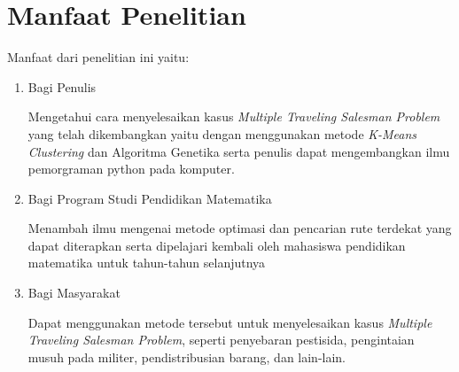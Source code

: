 \section{Manfaat Penelitian}

Manfaat dari penelitian ini yaitu:
\begin{enumerate}
	\item Bagi Penulis

	Mengetahui cara menyelesaikan kasus \textit{Multiple Traveling Salesman Problem} yang telah dikembangkan yaitu dengan menggunakan metode \textit{K-Means Clustering} dan Algoritma Genetika serta penulis dapat mengembangkan ilmu pemorgraman python pada komputer.

	\item Bagi Program Studi Pendidikan Matematika
	
	Menambah ilmu mengenai metode optimasi dan pencarian rute terdekat yang dapat diterapkan serta dipelajari kembali oleh mahasiswa pendidikan matematika untuk tahun-tahun selanjutnya
	
	\item Bagi Masyarakat
	
	Dapat menggunakan metode tersebut untuk menyelesaikan kasus \textit{Multiple Traveling Salesman Problem}, seperti penyebaran pestisida, pengintaian musuh pada militer, pendistribusian barang, dan lain-lain.
	
\end{enumerate}
